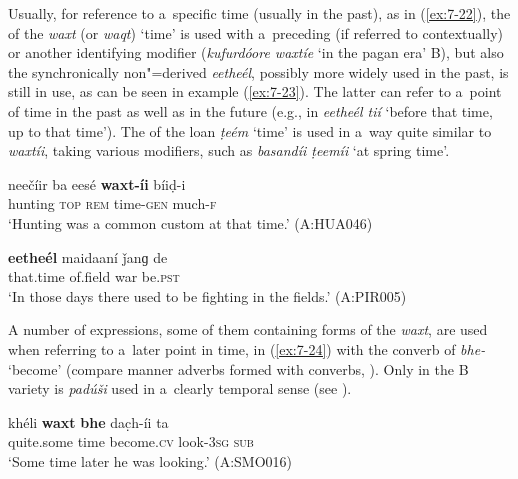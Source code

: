  Usually, for reference to a~specific time (usually in the past), as in (\ref{ex:7-22}), the  of the  \textit{waxt} (or \textit{waqt}) `time' is used with a~preceding  (if referred to contextually) or another identifying modifier (\textit{kufurdóore waxtíe} `in the pagan era' B), but also the synchronically non"=derived  \textit{eetheél}, possibly more widely used in the past, is still in use, as can be seen in example (\ref{ex:7-23}). The latter can refer to a~point of time in the past as well as in the future (e.g., in \textit{eetheél tií} `before that time, up to that time'). The  of the \iliEnglish loan \textit{ṭeém} `time' is used in a~way quite similar to \textit{waxtíi}, taking various modifiers, such as \textit{basandíi ṭeemíi} `at spring time'.

\begin{exe}
\ex
\label{ex:7-22}
\gll neečíir ba eesé \textbf{waxt-íi} bíiḍ-i \\
hunting \textsc{top} \textsc{rem} time-\textsc{gen}  much-\textsc{f} \\
\glt `Hunting was a common custom at that time.' (A:HUA046)

\ex
\label{ex:7-23}
\gll \textbf{eetheél} maidaaní ǰanɡ de \\
that.time  of.field  war be.\textsc{pst } \\
\glt `In those days there used to be fighting in the fields.' (A:PIR005)
\end{exe}


 A number of expressions, some of them containing forms of the  \textit{waxt}, are used when referring to a~later point in time, in (\ref{ex:7-24}) with the converb of \textit{bhe-} `become' (compare manner adverbs formed with converbs, ). Only in the B variety is \textit{padúši} used in a~clearly temporal sense (see ).

\begin{exe}
\ex
\label{ex:7-24}
\gll khéli \textbf{waxt} \textbf{bhe} dac̣h-íi ta \\
quite.some time become.\textsc{cv} look-\textsc{3sg} \textsc{sub}\\
\glt `Some time later he was looking.' (A:SMO016) 
\end{exe}

